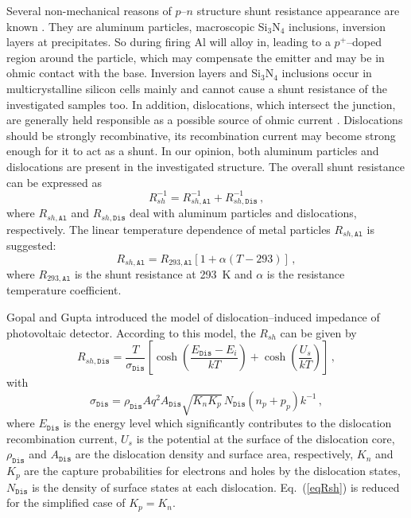\documentclass[aip,jap, amsmath,amssymb,reprint]{revtex4-1}
\begin{document}
Several non-mechanical reasons of $p$--$n$ structure shunt resistance appearance are known \cite{Rsh:Breitenstein}.
They are aluminum particles, macroscopic Si$_3$N$_4$ inclusions, inversion layers at precipitates.
So during firing Al will alloy in, leading to a $p^+$--doped region around the particle, which may compensate the emitter and may be in ohmic contact with the
base.
Inversion layers and Si$_3$N$_4$ inclusions occur in multicrystalline silicon cells mainly \cite{Rsh:Breitenstein} and cannot cause a shunt resistance of the investigated samples too.
In addition, dislocations, which intersect the junction, are generally held responsible as a possible source of ohmic current \cite{Rsh:Breitenstein,TAT:Gopal,Rsh:Baker}.
Dislocations should be strongly recombinative, its recombination current may become strong enough for it to act as a shunt.
In our opinion, both aluminum particles and dislocations are present in the investigated structure.
The overall shunt resistance can be expressed as
\begin{equation}
\label{eqRshFull}
R_{sh}^{-1}=R_{sh,\mathtt{Al}}^{-1}+R_{sh,\mathtt{Dis}}^{-1}\,,
\end{equation}
where
$R_{sh,\mathtt{Al}}$ and $R_{sh,\mathtt{Dis}}$ deal with aluminum particles and dislocations, respectively.
The linear temperature dependence of metal particles $R_{sh,\mathtt{Al}}$ is suggested:
\begin{equation}
\label{eqRshAl}
R_{sh,\mathtt{Al}}=R_{293,\mathtt{Al}}[1+\alpha(T-293)]\,,
\end{equation}
where
$R_{293,\mathtt{Al}}$ is the shunt resistance at 293~K and
$\alpha$ is the resistance temperature coefficient.

Gopal and Gupta \cite{Rsh:Gopal2003,Rsh:Gopal2004} introduced the model of dislocation--induced impedance of photovoltaic detector.
According to this model, the $R_{sh}$ can be given by
\begin{equation}
\label{eqRsh}
R_{sh,\mathtt{Dis}}=\frac{T}{\sigma_{\mathtt{Dis}}}\left[\cosh\left(\frac{E_\mathtt{Dis}-E_i}{kT}\right)+\cosh\left(\frac{U_s}{kT}\right)\right]\,,
\end{equation}
with
\begin{equation}
\label{eqRdis}
\sigma_{\mathtt{Dis}}=\rho_{\mathtt{Dis}}Aq^2A_{\mathtt{Dis}}\sqrt{K_nK_p}\,N_{\mathtt{Dis}}(n_p+p_p)k^{-1}\,,
\end{equation}
where
$E_{\mathtt{Dis}}$ is the energy level which significantly contributes to the dislocation recombination current,
$U_s$ is the potential at the surface of the dislocation core,
$\rho_{\mathtt{Dis}}$ and $A_{\mathtt{Dis}}$ are the dislocation density and surface area, respectively,
$K_n$ and $K_p$ are the capture probabilities for electrons and holes by the dislocation states,
$N_{\mathtt{Dis}}$ is the density of surface states at each dislocation.
Eq.~(\ref{eqRsh}) is reduced for the simplified case of $K_p=K_n$.
\end{document}
